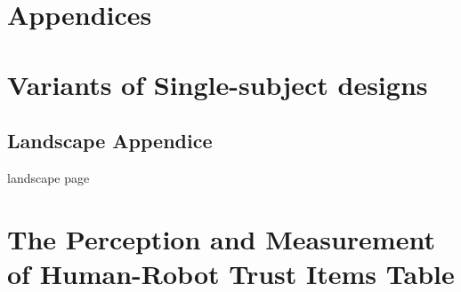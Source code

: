 \section*{Appendices}
\section{Variants of Single-subject designs}

\newpage
\begin{landscape}
	\section{Landscape Appendice}
	\label{app:Educational}	
	landscape page
\end{landscape}

\newpage
\section{The Perception and Measurement of Human-Robot Trust Items Table}
